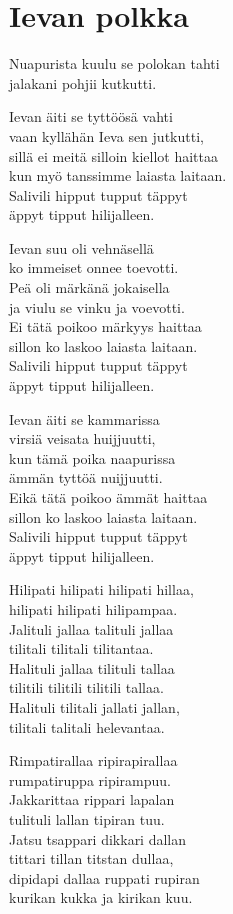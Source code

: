 \section{Ievan polkka}

Nuapurista kuulu se polokan tahti\\
jalakani pohjii kutkutti.


Ievan äiti se tyttöösä vahti\\
vaan kyllähän Ieva sen jutkutti,\\
sillä ei meitä silloin kiellot haittaa\\
kun myö tanssimme laiasta laitaan.\\
Salivili hipput tupput täppyt\\
äppyt tipput hilijalleen.


Ievan suu oli vehnäsellä\\
ko immeiset onnee toevotti.\\
Peä oli märkänä jokaisella\\
ja viulu se vinku ja voevotti.\\
Ei tätä poikoo märkyys haittaa\\
sillon ko laskoo laiasta laitaan.\\
Salivili hipput tupput täppyt\\
äppyt tipput hilijalleen.


Ievan äiti se kammarissa\\
virsiä veisata huijjuutti,\\
kun tämä poika naapurissa\\
ämmän tyttöä nuijjuutti.\\
Eikä tätä poikoo ämmät haittaa\\
sillon ko laskoo laiasta laitaan.\\
Salivili hipput tupput täppyt\\
äppyt tipput hilijalleen.


Hilipati hilipati hilipati hillaa,\\
hilipati hilipati hilipampaa.\\
Jalituli jallaa talituli jallaa\\
tilitali tilitali tilitantaa.\\
Halituli jallaa tilituli tallaa\\
tilitili tilitili tilitili tallaa.\\
Halituli tilitali jallati jallan,\\
tilitali talitali helevantaa.


Rimpatirallaa ripirapirallaa\\
rumpatiruppa ripirampuu.\\
Jakkarittaa rippari lapalan\\
tulituli lallan tipiran tuu.\\
Jatsu tsappari dikkari dallan\\
tittari tillan titstan dullaa,\\
dipidapi dallaa ruppati rupiran\\
kurikan kukka ja kirikan kuu.


